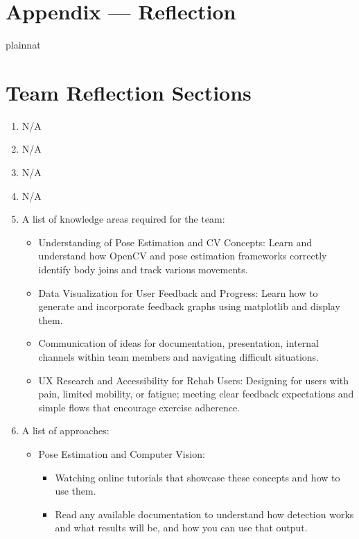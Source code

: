 \documentclass[12pt]{article}
\begin{document}
\newpage{}
\section*{Appendix --- Reflection}




 {plainnat}


\section*{Team Reflection Sections}
\begin{enumerate}
  \item N/A
  \item N/A
  \item N/A
  \item N/A
  \item A list of knowledge areas required for the team:
  \begin{itemize}
    \item Understanding of Pose Estimation and CV Concepts: Learn and understand how OpenCV and pose estimation frameworks correctly identify body joins and track various movements.
    \item Data Visualization for User Feedback and Progress: Learn how to generate and incorporate feedback graphs using matplotlib and display them.
    \item Communication of ideas for documentation, presentation, internal channels within team members and navigating difficult situations.
    \item UX Research and Accessibility for Rehab Users: Designing for users with pain, limited mobility, or fatigue; meeting clear feedback expectations and simple flows that encourage exercise adherence.
  \end{itemize}
  \item A list of approaches:
  \begin{itemize}
    \item Pose Estimation and Computer Vision:
    \begin{itemize}
      \item Watching online tutorials that showcase these concepts and how to use them.
      \item Read any available documentation to understand how detection works and what results will be, and how you can use that output.
    \end{itemize}

\end{itemize}
\end{enumerate}
\end{document}
